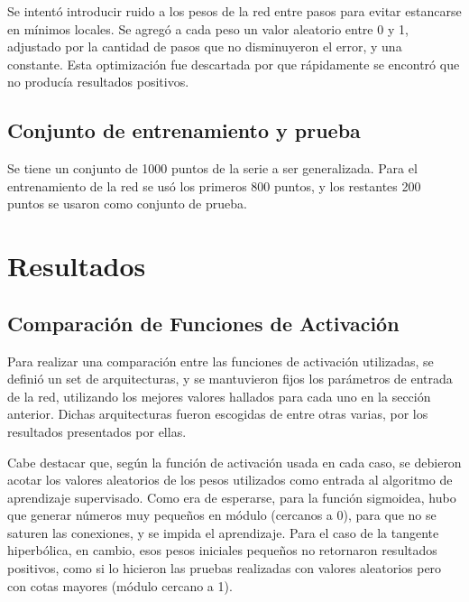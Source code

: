\documentclass[a4paper,10pt]{article}
\begin{document}
        Se intentó introducir ruido a los pesos de la red entre pasos para evitar estancarse en mínimos locales.
        Se agregó a cada peso un valor aleatorio entre 0 y 1, adjustado por la cantidad de pasos que no disminuyeron el error, y una constante.
        Esta optimización fue descartada por que rápidamente se encontró que no producía resultados positivos.

    \subsection{Conjunto de entrenamiento y prueba}

    Se tiene un conjunto de 1000 puntos de la serie a ser generalizada.
    Para el entrenamiento de la red se usó los primeros 800 puntos, y los restantes 200 puntos se usaron como conjunto de prueba.

\section{Resultados}

    \subsection{Comparación de Funciones de Activación}

    Para realizar una comparación entre las funciones de activación utilizadas, se definió un set de arquitecturas, y se mantuvieron fijos los parámetros de entrada de la red, 
    utilizando los mejores valores hallados para cada uno en la sección anterior. Dichas arquitecturas fueron escogidas de entre otras varias, por los resultados presentados por ellas.

    Cabe destacar que, según la función de activación usada en cada caso, se debieron acotar los valores aleatorios de los pesos utilizados como entrada al algoritmo de aprendizaje
    supervisado. Como era de esperarse, para la función sigmoidea, hubo que generar números muy pequeños en módulo (cercanos a 0), para que no se saturen las conexiones, y se impida el aprendizaje.
    Para el caso de la tangente hiperbólica, en cambio, esos pesos  iniciales pequeños no retornaron resultados positivos, como si lo hicieron las pruebas realizadas con valores 
    aleatorios pero con cotas mayores (módulo cercano a 1).
\end{document}

